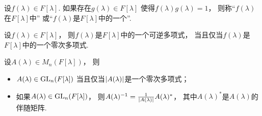 \begin{definition}%
设\(f(\lambda) \in F[\lambda]\).
如果存在\(g(\lambda) \in F[\lambda]\)
使得\(f(\lambda) g(\lambda) = 1\)，
则称“\(f(\lambda)\)在\(F[\lambda]\)中”
或“\(f(\lambda)\)是\(F[\lambda]\)中的一个”.
\end{definition}

\begin{theorem}%
设\(f(\lambda) \in F[\lambda]\)，
则\(f(\lambda)\)是\(F[\lambda]\)中的一个可逆多项式，
当且仅当\(f(\lambda)\)是\(F[\lambda]\)中的一个零次多项式.
\end{theorem}

\begin{theorem}
设\(A(\lambda) \in M_n(F[\lambda])\)，
则\begin{itemize}
	\item \(A(\lambda) \in \operatorname{GL}_n(F[\lambda])\)
	当且仅当\(\abs{A(\lambda)}\)是一个零次多项式；
	\item 如果\(A(\lambda) \in \operatorname{GL}_n(F[\lambda])\)，
	则\(A(\lambda)^{-1} = \frac{1}{\abs{A(\lambda)}} A(\lambda)^*\)，
	其中\(A(\lambda)^*\)是\(A(\lambda)\)的伴随矩阵.
\end{itemize}
\end{theorem}

